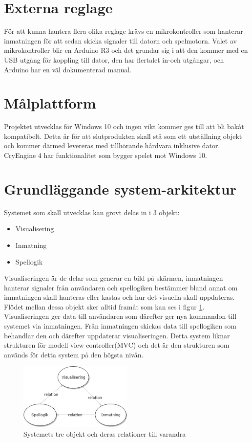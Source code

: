 \documentclass[a4paper,12pt,oneside,final]{extbook}
\begin{document}
\section{Externa reglage}
För att kunna hantera flera olika reglage krävs en mikrokontroller som hanterar inmatningen för att sedan skicka signaler till datorn och spelmotorn. Valet av mikrokontroller blir en Arduino R3 och det grundar sig i att den kommer med en USB utgång för koppling till dator, den har flertalet in-och utgångar, och Arduino har en väl dokumenterad manual.

\section{Målplattform}

Projektet utvecklas för Windows 10 och ingen vikt kommer ges till att bli bakåt kompatibelt. Detta är för att slutprodukten skall stå som ett utställning objekt och kommer därmed levereras med tillhörande hårdvara inklusive dator. CryEngine 4 har funktionalitet som bygger spelet mot Windows 10.  

\section{Grundläggande system-arkitektur}
Systemet som skall utvecklas kan grovt delas in i 3 objekt:
\begin{itemize}
	\item Visualisering
	\item Inmatning
	\item Spellogik
\end{itemize}
Visualiseringen är de delar som generar en bild på skärmen, inmatningen hanterar signaler från användaren och spellogiken bestämmer bland annat om inmatningen skall hanteras eller kastas och hur det visuella skall uppdateras. Flödet mellan dessa objekt sker alltid framåt som kan ses i figur \ref{fig:System}. Visualiseringen ger data till användaren som därefter ger nya kommandon till systemet via inmatningen. Från inmatningen skickas data till spellogiken som  behandlar den och därefter uppdaterar visualiseringen. Detta system liknar strukturen för modell view controller(MVC)\cite{Design} och det är den strukturen som används för detta system på den högsta nivån. 

\begin{figure}[h]
	\includegraphics[width=0.5\textwidth, center]{System.jpg}
	\caption{Systemets tre objekt och deras relationer till varandra}
	\label{fig:System}
\end{figure}
\end{document}
